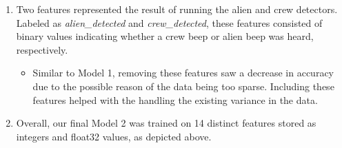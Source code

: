 \documentclass[11pt]{article}
\begin{document}
\begin{enumerate}
\begin{itemize}
\end{itemize}
\item Two features represented the result of running the alien and crew detectors. Labeled as \textit{alien\_detected} and \textit{crew\_detected}, these features consisted of binary values indicating whether a crew beep or alien beep was heard, respectively. 
\begin{itemize}
    \item Similar to Model 1, removing these features saw a decrease in accuracy due to the possible reason of the data being too sparse. Including these features helped with the handling the existing variance in the data. 
\end{itemize}

\item Overall, our final Model 2 was trained on 14 distinct features stored as integers and float32 values, as depicted above. 
\end{enumerate}
\end{document}
